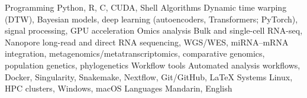 
\begin{cvskills}
  \cvskill
    {Programming}
    {Python, R, C, CUDA, Shell}
  \cvskill
    {Algorithms}
    {Dynamic time warping (DTW), Bayesian models, deep learning (autoencoders, Transformers; PyTorch), signal processing, GPU acceleration}
  \cvskill
    {Omics analysis}
    {Bulk and single-cell RNA-seq, Nanopore long-read and direct RNA sequencing, WGS/WES, miRNA--mRNA integration, metagenomics/metatranscriptomics, comparative genomics, population genetics, phylogenetics}
  \cvskill
    {Workflow tools}
    {Automated analysis workflows, Docker, Singularity, Snakemake, Nextflow, Git/GitHub, LaTeX}
  \cvskill
    {Systems}
    {Linux, HPC clusters, Windows, macOS}
  \cvskill
    {Languages}
    {Mandarin, English}
\end{cvskills}
